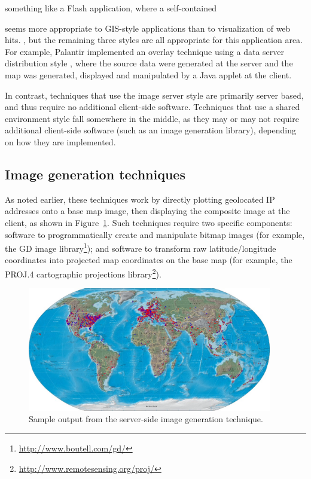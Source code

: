 \documentclass[acmtocl,acmnow]{acmtrans2m}
\begin{document}
something like a Flash application, where a self-contained

seems more appropriate to
GIS-style applications than to visualization of web hits. 
, but the
remaining three styles are all appropriate for this application area.
For example, Palantir implemented an overlay technique using a data
server distribution style \cite{Papa-N-1998-Palantir}, where the source
data were generated at the server and the map was generated, displayed
and manipulated by a Java applet at the client.

In contrast, techniques that use the image server style are primarily
server based, and thus require no additional client-side software.
Techniques that use a shared environment style fall somewhere in the
middle, as they may or may not require additional client-side software
(such as an image generation library), depending on how they are
implemented.


\subsection{Image generation techniques}
\label{sec-image-gen}

As noted earlier, these techniques work by directly plotting geolocated IP
addresses onto a base map image, then displaying the composite image at
the client, as shown in Figure~\ref{fig-image}. Such techniques require two
specific components: software to programmatically create and manipulate
bitmap images (for example, the GD image
library\footnote{\url{http://www.boutell.com/gd/}}); and software to
transform raw latitude/longitude coordinates into projected map
coordinates on the base map (for example, the PROJ.4 cartographic
projections library\footnote{\url{http://www.remotesensing.org/proj/}}).


\begin{figure}
	\begin{center}
		\includegraphics[width=0.95\textwidth,keepaspectratio]{ImageGeneration-full}
	\end{center}
	\caption{Sample output from the server-side image generation technique.}
	\label{fig-image}
\end{figure}
\end{document}
